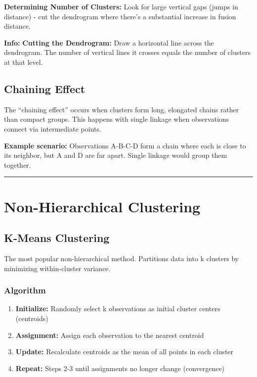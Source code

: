 \documentclass[
]{article}
\begin{document}
\textbf{Determining Number of Clusters:} Look for large vertical gaps
(jumps in distance) - cut the dendrogram where there's a substantial
increase in fusion distance.

\textbf{Info: } \textbf{Cutting the Dendrogram:} Draw a horizontal line
across the dendrogram. The number of vertical lines it crosses equals
the number of clusters at that level.

\textbf{ }

\subsection{Chaining Effect}

The ``chaining effect'' occurs when clusters form long, elongated chains
rather than compact groups. This happens with single linkage when
observations connect via intermediate points.

\textbf{Example scenario:} Observations A-B-C-D form a chain where each
is close to its neighbor, but A and D are far apart. Single linkage
would group them together.

\begin{center}\rule{0.5\linewidth}{0.5pt}\end{center}

\textbf{ }

\section{Non-Hierarchical Clustering}

\textbf{ }

\subsection{K-Means Clustering}

The most popular non-hierarchical method. Partitions data into k
clusters by minimizing within-cluster variance.

\subsubsection{Algorithm}

\begin{enumerate}
\item
  \textbf{Initialize:} Randomly select k observations as initial cluster
  centers (centroids)
\item
  \textbf{Assignment:} Assign each observation to the nearest centroid
\item
  \textbf{Update:} Recalculate centroids as the mean of all points in
  each cluster
\item
  \textbf{Repeat:} Steps 2-3 until assignments no longer change
  (convergence)
\end{enumerate}
\end{document}
